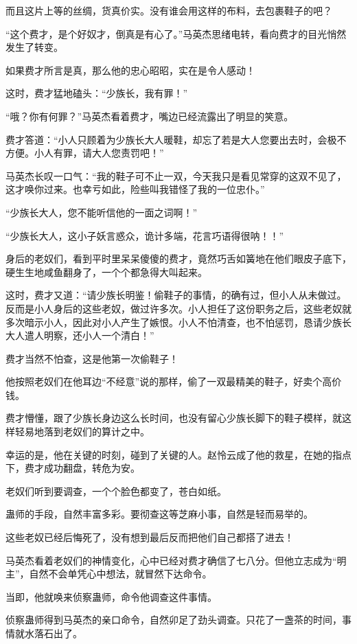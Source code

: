 \begin{this_body}
而且这片上等的丝绸，货真价实。没有谁会用这样的布料，去包裹鞋子的吧？

“这个费才，是个好奴才，倒真是有心了。”马英杰思绪电转，看向费才的目光悄然发生了转变。

如果费才所言是真，那么他的忠心昭昭，实在是令人感动！

这时，费才猛地磕头：“少族长，我有罪！”

“哦？你有何罪？”马英杰看着费才，嘴边已经流露出了明显的笑意。

费才答道：“小人只顾着为少族长大人暖鞋，却忘了若是大人您要出去时，会极不方便。小人有罪，请大人您责罚吧！”

马英杰长叹一口气：“我的鞋子可不止一双，今天我只是看见常穿的这双不见了，这才唤你过来。也幸亏如此，险些叫我错怪了我的一位忠仆。”

“少族长大人，您不能听信他的一面之词啊！”

“少族长大人，这小子妖言惑众，诡计多端，花言巧语得很呐！！”

身后的老奴们，看到平时里呆呆傻傻的费才，竟然巧舌如簧地在他们眼皮子底下，硬生生地咸鱼翻身了，一个个都急得大叫起来。

这时，费才又道：“请少族长明鉴！偷鞋子的事情，的确有过，但小人从未做过。反而是小人身后的这些老奴，做过许多次。小人担任了这份职务之后，这些老奴就多次暗示小人，因此对小人产生了嫉恨。小人不怕清查，也不怕惩罚，恳请少族长大人遣人明察，还小人一个清白！”

费才当然不怕查，这是他第一次偷鞋子！

他按照老奴们在他耳边“不经意”说的那样，偷了一双最精美的鞋子，好卖个高价钱。

费才懵懂，跟了少族长身边这么长时间，也没有留心少族长脚下的鞋子模样，就这样轻易地落到老奴们的算计之中。

幸运的是，他在关键的时刻，碰到了关键的人。赵怜云成了他的救星，在她的指点下，费才成功翻盘，转危为安。

老奴们听到要调查，一个个脸色都变了，苍白如纸。

蛊师的手段，自然丰富多彩。要彻查这等芝麻小事，自然是轻而易举的。

这些老奴已经后悔死了，没有想到最后反而把他们自己都搭了进去！

马英杰看着老奴们的神情变化，心中已经对费才确信了七八分。但他立志成为“明主”，自然不会单凭心中想法，就冒然下达命令。

当即，他就唤来侦察蛊师，命令他调查这件事情。

侦察蛊师得到马英杰的亲口命令，自然卯足了劲头调查。只花了一盏茶的时间，事情就水落石出了。


\end{this_body}
